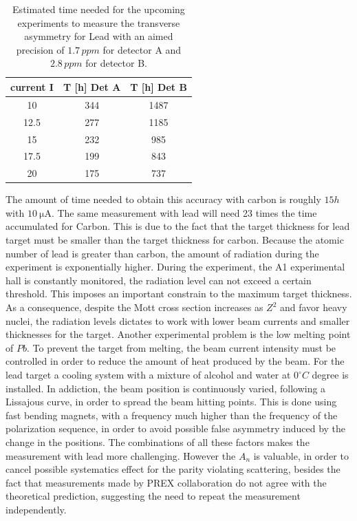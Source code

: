 \begin{table}[h]
\centering
\begin{tabular}{c|c|c}
\hline
   current I &   T [h] Det A &   T [h] Det B \\
\hline
        10   &       344 &      1487  \\
        12.5 &       277 &      1185   \\
        15   &       232 &      985 \\
        17.5 &       199 &      843 \\
        20   &       175 &      737 \\
\hline
\end{tabular}
\caption{Estimated time needed for the upcoming experiments to measure the transverse asymmetry for Lead with an aimed precision of $1.7 \, ppm$ for detector A and $2.8 \, ppm$ for detector B.}
\end{table}

The amount of time needed to obtain this accuracy with carbon is roughly $15 h$ with $\SI{10}{\micro \ampere}$. The same measurement with lead will need 23 times the time accumulated for Carbon. This is due to the fact that the target thickness for lead target must be smaller than the target thickness for carbon. Because the atomic number of lead is greater than carbon, the amount of radiation during the experiment is exponentially higher. During the experiment, the A1 experimental hall is constantly monitored, the radiation level can not exceed a certain threshold. This imposes an important constrain to the maximum target thickness. As a consequence, despite the Mott cross section increases as $Z^{2}$ and favor heavy nuclei, the radiation levels dictates to work with lower beam currents and smaller thicknesses for the target. Another experimental problem is the low melting point of $Pb$. To prevent the target from melting, the beam current intensity must be controlled in order to reduce the amount of heat produced by the beam. For the lead target a cooling system with a mixture of alcohol and water at $0^{\circ} C$  degree is installed. In addiction, the beam position is continuously varied, following a Lissajous curve, in order to spread the beam hitting points. This is done using fast bending magnets, with a frequency much higher than the frequency of the polarization sequence, in order to avoid possible false asymmetry induced by the change in the positions. The combinations of all these factors makes the measurement with lead more challenging. However the $A_{n}$ is valuable, in order to cancel possible systematics effect for the parity violating scattering, besides the fact that measurements made by PREX collaboration \cite{HAPPEX:2012fud} do not agree with the theoretical prediction, suggesting the need to repeat the measurement independently. 




